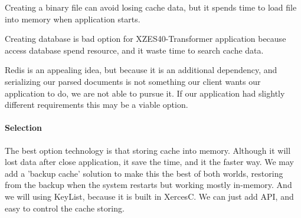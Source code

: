 Creating a binary file can avoid losing cache data, but it spends time to load file into memory when application starts.

Creating database is bad option for XZES40-Transformer application because access database spend resource, and it waste time to search cache data.

Redis is an appealing idea, but because it is an additional dependency, and serializing our parsed documents is not something our client wants our application to do, we are not able to pursue it.
If our application had slightly different requirements this may be a viable option.

\paragraph{Selection}

The best option technology is that storing cache into memory.
Although it will lost data after close application, it save the time, and it the faster way.
We may add a 'backup cache' solution to make this the best of both worlds, restoring from the backup when the system restarts but working mostly in-memory.
And we will using KeyList, because it is built in XercesC.
We can just add API, and easy to control the cache storing.
